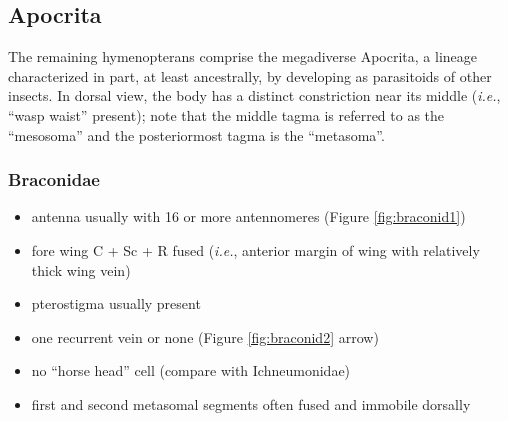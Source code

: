 \documentclass[letterpaper, 11pt]{article}
\begin{document}
\subsection{Apocrita}
The remaining hymenopterans comprise the megadiverse Apocrita, a lineage characterized in part, at least ancestrally, by developing as parasitoids of other insects. In dorsal view, the body has a distinct constriction near its middle (\textit{i.e.}, ``wasp waist'' present); note that the middle tagma is referred to as the ``mesosoma'' and the posteriormost tagma is the ``metasoma''. 

\subsubsection{Braconidae}
\begin{itemize}
\item antenna usually with 16 or more antennomeres (Figure \ref{fig:braconid1})
\item fore wing C + Sc + R fused (\textit{i.e.}, anterior margin of wing with relatively thick wing vein)
\item pterostigma usually present 
\item one recurrent vein or none (Figure \ref{fig:braconid2} arrow) 
\item no ``horse head'' cell (compare with Ichneumonidae)
\item first and second metasomal segments often fused and immobile dorsally 
\end{itemize}
\end{document}
